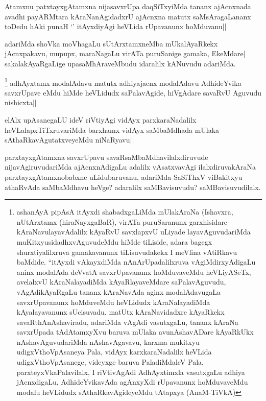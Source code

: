 \begin{artha}
Atamxnu patxtayxgAtamxna nijasavxrUpa daqSiTxyiMda tananx ajAcnxnada avadhi payARMtara kAraNanAgidadxrU ajAcnxna matutx saMsAragaLananx toDedu hAki punaH `\stext' itAyxdiyAgi heVLida rUpavanunx hoMduvanu||
\end{artha}


\begin{artha}
adariMda shoVka moVhagaLu sUtArxtamxneMba mUkalAyaRkekx jAcnxpakavu, mupupx, maraNagaLu virATa puruSanige gamaka, EkeMdare| sakalakAyaRgaLige upasaMhAraveMbudu idaralilx kANuvudu adariMda.
\end{artha}

\begin{artha}%
\footnote[1]{ashanAyA pipAsA itAyxdi shabadxgaLiMda mUlakAraNa (Ishavxra, nUtArxtamx (hiraNayxgaBaR), virATa puruSaranunx garxhisidare kAraNavulayavAdalilx kAyaRvU savxlapxvU uLiyade layavAguvudariMda muKitxyusidadhxvAguvudeMdu hiMde tiLiside, adara bagegx shurxtiyalilxruva gamakavanunx tiLisuvudakekx I meVlina vAtiRkavu baMdide. ``\stext itAyxdi vAkayxdiMda nAnArUpadalilxruva vAgiMdirxyAdigaLu aninx modalAda deVvatA savxrUpavanunx hoMduvaveMdu heVLiyASeTx, avelalxvU kAraNalayadiMda kAyaRlayaveMdare saPalavAguvudu, vAgAdikAyaRgaLu tananx kAraNavAda aginx modalAdavugaLa savxrUpavanunx hoMduveMdu heVLidudx kAraNalayadiMda kAyalayavanunx sUcisuvadu. matUtx kAraNavidadxre kAyaRkekx savaRthAnAshaviradu, adariMda vAgAdi vasutxgaLu, tananx kAraNa savxrUpada tAdAtamxyXvu baruva mUlaka avunAshavADare kAyaRkUkx nAshavAguvudariMda nAshavAgavavu, karxma mukitxyu udigxVthoVpAsaneya Pala, vidAyx karxkaraNadalilx heVLida udigxVthoVpAsanege, videyxge baruva PaladiMdaleV Pala, parxteyxVkaPalavilalx, I riVtivAgAdi AdhAyxtimxla vasutxgaLu adhiya jAcnxdigaLu, AdhideYvikavAda agAnxyXdi rUpavanunx hoMduvaveMdu modalu heVLidudx sAthaRkavAgideyeMdu tAtapxya (AnaM-TiVkA)} adhAyxtamx modalAdavu matutx adhiyajacnx modalAdavu AdhideYvika savxrUpave eMdu hiMde heVLidudx saPalavAgide, hiVgAdare savaRvU Aguvudu nishicxta||
\end{artha}

\begin{artha}%
elAlx upAsanegaLU ideV riVtiyAgi vidAyx parxkaraNadalilx heVLalapxTiTxruvariMda barxhamx vidAyx saMbaMdhada mUlaka sAthaRkavAgutatxveyeMdu niNaRyavu||
\end{artha}

\begin{artha}
parxtayxgAtamxna savxrUpavu savaRsaMbaMdhavilalxdiruvude nijavAgiruvudariMda ajAcnxnAdigaLu adalilx vAsatxvavAgi ilalxdiruvakAraNa parxtayxgAtamxnobabxne uLidubaruvanu, adariMda SaSiThxV viBakitxyu athaRvAda saMbaMdhavu heVge? adaralilx saMBavisuvudu? saMBavisuvudilalx.
\end{artha}

